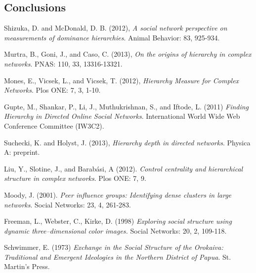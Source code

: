 \documentclass[3p,times]{elsarticle}
\begin{document}
\begin{enumerate}
\section{Conclusions}






\begin{thebibliography}{9}
	Shizuka, D. and McDonald, D. B. (2012),
	\textit{A social network perspective on measurements of dominance hierarchies}. 
	Animal Behavior: 83, 925-934.
	
	Murtra, B., Goni, J., and Caso, C. (2013),
	\textit{On the origins of hierarchy in complex networks}. 
	PNAS: 110, 33, 13316-13321.

	Mones, E., Vicsek, L., and Vicsek, T. (2012),
	\textit{Hierarchy Measure for Complex Networks}. 
	Plos ONE: 7, 3, 1-10.
	
		Gupte, M., Shankar, P., Li, J., Muthukrishnan, S., and Iftode, L. (2011)
		\textit{Finding Hierarchy in Directed Online Social Networks}. 
		International World Wide Web Conference Committee (IW3C2).
		
		Suchecki, K. and Holyst, J. (2013),
		\textit{Hierarchy depth in directed networks}. 
		Physica A: preprint.
		
	Liu, Y., Slotine, J., and Barab{\'a}si, A (2012).
	\textit{Control centrality and hierarchical structure in complex networks}.
	Plos ONE: 7, 9.
	
	Moody, J. (2001).
	\textit{Peer influence groups: Identifying dense clusters in large networks}.
	Social Networks: 23, 4, 261-283.
	
	Freeman, L., Webster, C., Kirke, D. (1998)
	\textit{Exploring social structure using dynamic three--dimensional color images.}
	Social Networks: 20, 2, 109-118.
	
	Schwimmer, E. (1973)
	\textit{Exchange in the Social Structure of the Orokaiva: Traditional and Emergent Ideologies in the Northern District of Papua}.
	St. Martin's Press.
	

\end{thebibliography}
\end{enumerate}
\end{document}
